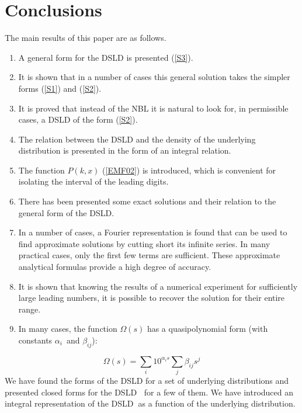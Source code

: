 \documentclass[titlepage,fleqn]{article}%
\begin{document}
\section{Conclusions}

The main results of this paper are as follows.

\begin{enumerate}
\item A general form for the DSLD is presented (\ref{S3}).

\item It is shown that in a number of cases this general solution takes the
simpler forms (\ref{S1}) and (\ref{S2}).

\item It is proved that instead of the NBL it is natural to look for, in
permissible cases, a DSLD of the form (\ref{S2}).

\item The relation between the DSLD and the density of the underlying
distribution is presented in the form of an integral relation.

\item The function $P(k,x)$ (\ref{EMF02}) is introduced, which is convenient
for isolating the interval of the leading digits.

\item There has been presented some exact solutions and their relation to the
general form of the DSLD.

\item In a number of cases, a Fourier representation is found that can be used
to find approximate solutions by cutting short its infinite series. In many
practical cases, only the first few terms are sufficient. These approximate
analytical formulas provide a high degree of accuracy.

\item It is shown that knowing the results of a numerical experiment for
sufficiently large leading numbers, it is possible to recover the solution for
their entire range.

\item In many cases, the function $\Omega(s)$ has a quasipolynomial form (with
constants $\alpha_{i}$\ and $\beta_{ij}$):
\end{enumerate}

%

\[
\Omega(s)=%
{\displaystyle\sum\limits_{i}}
10^{\alpha_{i}s}%
{\displaystyle\sum\limits_{j}}
\beta_{ij}s^{j}%
\]
We have found the forms of the DSLD for a set of underlying distributions and
presented closed forms for the DSLD\textbf{\ } for a few of them. We have
introduced an integral representation of the DSLD\textbf{\ }as a function of
the underlying distribution.
\end{document}
